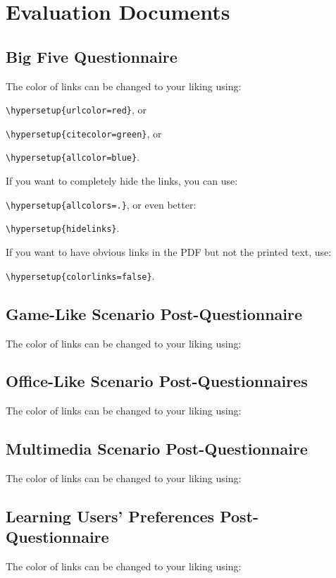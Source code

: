 
\chapter{Evaluation Documents} %

\label{AppendixA} %

\section{Big Five Questionnaire}

The color of links can be changed to your liking using:

{\small\verb!\hypersetup{urlcolor=red}!}, or

{\small\verb!\hypersetup{citecolor=green}!}, or

{\small\verb!\hypersetup{allcolor=blue}!}.

\noindent If you want to completely hide the links, you can use:

{\small\verb!\hypersetup{allcolors=.}!}, or even better: 

{\small\verb!\hypersetup{hidelinks}!}.

\noindent If you want to have obvious links in the PDF but not the printed text, use:

{\small\verb!\hypersetup{colorlinks=false}!}.

\section{Game-Like Scenario Post-Questionnaire}

The color of links can be changed to your liking using:

\section{Office-Like Scenario Post-Questionnaires}

The color of links can be changed to your liking using:

\section{Multimedia Scenario Post-Questionnaire}

The color of links can be changed to your liking using:

\section{Learning Users' Preferences Post-Questionnaire}

The color of links can be changed to your liking using: